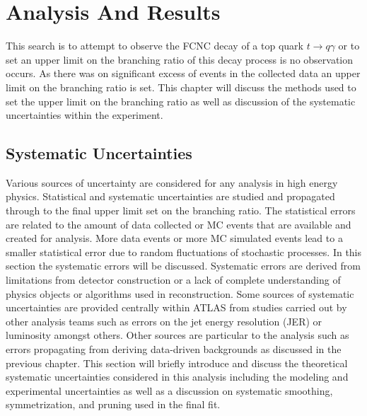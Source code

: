 
\chapter{Analysis And Results}
\label{ch:Results}
This search is to attempt to observe the FCNC decay of a top quark $t \rightarrow q \gamma$ or to set an upper limit on the branching ratio of this decay process is no observation occurs.  As there was on significant excess of events in the collected data an upper limit on the branching ratio is set.  This chapter will discuss  the methods used to set the upper limit on the branching ratio as well as discussion of the systematic uncertainties within the experiment. 

\section{Systematic Uncertainties}
\label{sec:NPUncertainties}
Various sources of uncertainty are considered for any analysis in high energy physics.  Statistical and systematic uncertainties are studied and propagated through to the final upper limit set on the branching ratio.  The statistical errors are related to the amount of data collected or MC events that are available and created for analysis.  More data events or more MC simulated events lead to a smaller statistical error due to random fluctuations of stochastic processes.  In this section the systematic errors will be discussed.  Systematic errors are derived from limitations from detector construction or a lack of complete understanding of physics objects or algorithms used in reconstruction.  Some sources of systematic uncertainties are provided centrally within ATLAS from studies carried out by other analysis teams such as errors on the jet energy resolution (JER) or luminosity amongst others. Other sources are particular to the analysis such as errors propagating from deriving data-driven backgrounds as discussed in the previous chapter.
This section will briefly introduce and discuss the theoretical systematic uncertainties considered in this analysis including the modeling and experimental uncertainties as well as a discussion on systematic smoothing, symmetrization, and pruning used in the final fit. 

